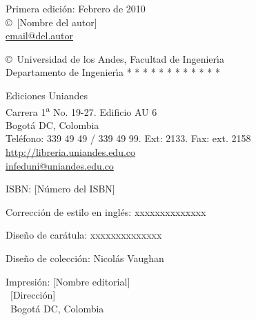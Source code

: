 %


\hbox{}\thispagestyle{empty}

\vspace*{-2cm}
\begin{center}
\noindent
{}

\end{center}

\vfill


{%
\parindent=0pt
\scriptsize

Primera edici{\'o}n:  Febrero de 2010\\

\copyright\ [Nombre del autor]\\
\url{email@del.autor}

\medskip

\copyright\ Universidad de los Andes, Facultad de Ingenier\'{\i}a\\
\phantom{\copyright\ }Departamento de Ingenier\'{\i}a * * * * * * * * * * * * \\

\bigskip

Ediciones Uniandes\\ Carrera 1\textsuperscript{a} No. 19-27. Edificio AU 6\\
Bogot{\'a} \textsc{DC}, Colombia\\
Tel{\'e}fono: 339 49 49 / 339 49 99. Ext: 2133. Fax: ext. 2158\\
\url{http://libreria.uniandes.edu.co}\\
\url{infeduni@uniandes.edu.co}

\bigskip

ISBN: [N{\'u}mero del ISBN]

\bigskip

Correcci{\'o}n de estilo en ingl{\'e}s: xxxxxxxxxxxxxx

\bigskip

Dise{\~n}o de car{\'a}tula: xxxxxxxxxxxxxx

\bigskip

Dise{\~n}o de colecci{\'o}n: Nicol{\'a}s Vaughan

\bigskip

Impresi{\'o}n: [Nombre editorial] \\ \
[Direcci{\'o}n] \\ \
Bogot{\'a} \textsc{DC}, Colombia

}

